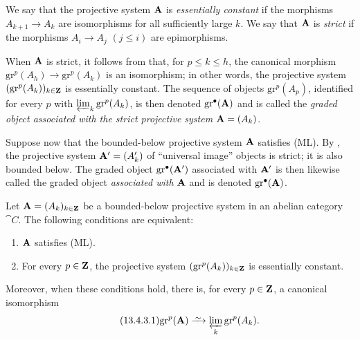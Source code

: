 \begin{env}[13.4.2]
\label{0.13.4.2}
We say that the projective system $\mathbf{A}$ is
\emph{essentially constant} if the morphisms
$A_{k+1}\longrightarrow A_k$ are isomorphisms for all sufficiently
large $k$.
We say that $\mathbf{A}$ is \emph{strict} if the morphisms
$A_i\longrightarrow A_j$ $(j\leq i)$ are epimorphisms.

When $\mathbf{A}$ is strict, it follows from  that, for
$p\leq k\leq h$, the canonical morphism $\mathrm{gr}^p(A_h)\longrightarrow\mathrm{gr}^p(A_k)$
is an isomorphism; in other words, the projective system
$(\mathrm{gr}^p(A_k))_{k\in\mathbf{Z}}$ is essentially constant.
The sequence of objects $\mathrm{gr}^p(A_p)$, identified for every
$p$ with $\varprojlim_k\mathrm{gr}^p(A_k)$, is then denoted
$\mathrm{gr}^\bullet(\mathbf{A})$ and is called the
\emph{graded object associated with the strict projective system}
$\mathbf{A}=(A_k)$.

Suppose now that the bounded-below projective system $\mathbf{A}$
satisfies (ML).
By , the projective system
$\mathbf{A}'=(A'_k)$ of ``universal image'' objects is strict; it is also
bounded below.
The graded object $\mathrm{gr}^\bullet(\mathbf{A}')$ associated with
$\mathbf{A}'$ is then likewise called the graded object
\emph{associated with} $\mathbf{A}$ and is denoted
$\mathrm{gr}^\bullet(\mathbf{A})$.
\end{env}

\begin{proposition}[13.4.3]
\label{0.13.4.3}
Let $\mathbf{A}=(A_k)_{k\in\mathbf{Z}}$ be a bounded-below projective system
in an abelian category $\cat{C}$.
The following conditions are equivalent:
\begin{enumerate}
  \item[{\rm a)}] $\mathbf{A}$ satisfies \textup{(ML)}.
  \item[{\rm b)}] For every $p\in\mathbf{Z}$, the projective system
  $(\mathrm{gr}^p(A_k))_{k\in\mathbf{Z}}$ is essentially constant.
\end{enumerate}
Moreover, when these conditions hold, there is, for every
$p\in\mathbf{Z}$, a canonical isomorphism
\begin{equation}
\label{0.13.4.3.1}
\tag{13.4.3.1}
  \mathrm{gr}^p(\bb{A})
  \isoto
  \varprojlim_k\mathrm{gr}^p(A_k).
\end{equation}
\end{proposition}

